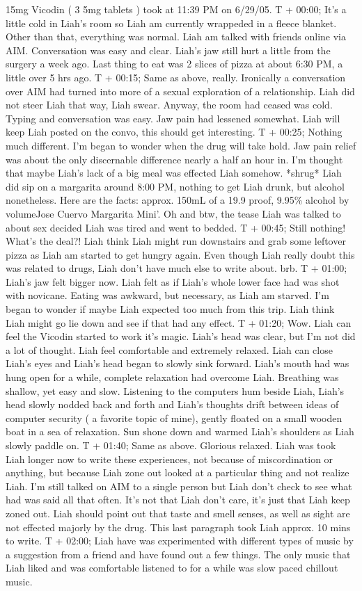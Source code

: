 \documentclass[12pt]{book}
\begin{document}
15mg Vicodin ( 3 5mg tablets ) took at 11:39 PM on 6/29/05. T + 00:00; It's a little cold in Liah's room so Liah am currently wrappeded in a fleece blanket. Other than that, everything was normal. Liah am talked with friends online via AIM. Conversation was easy and clear. Liah's jaw still hurt a little from the surgery a week ago. Last thing to eat was 2 slices of pizza at about 6:30 PM, a little over 5 hrs ago. T + 00:15; Same as above, really. Ironically a conversation over AIM had turned into more of a sexual exploration of a relationship. Liah did not steer Liah that way, Liah swear. Anyway, the room had ceased was cold. Typing and conversation was easy. Jaw pain had lessened somewhat. Liah will keep Liah posted on the convo, this should get interesting. T + 00:25; Nothing much different. I'm began to wonder when the drug will take hold. Jaw pain relief was about the only discernable difference nearly a half an hour in. I'm thought that maybe Liah's lack of a big meal was effected Liah somehow. *shrug* Liah did sip on a margarita around 8:00 PM, nothing to get Liah drunk, but alcohol nonetheless. Here are the facts: approx. 150mL of a 19.9 proof, 9.95\% alcohol by volumeJose Cuervo Margarita Mini'. Oh and btw, the tease Liah was talked to about sex decided Liah was tired and went to bedded. T + 00:45; Still nothing! What's the deal?! Liah think Liah might run downstairs and grab some leftover pizza as Liah am started to get hungry again. Even though Liah really doubt this was related to drugs, Liah don't have much else to write about. brb. T + 01:00; Liah's jaw felt bigger now. Liah felt as if Liah's whole lower face had was shot with novicane. Eating was awkward, but necessary, as Liah am starved. I'm began to wonder if maybe Liah expected too much from this trip. Liah think Liah might go lie down and see if that had any effect. T + 01:20; Wow. Liah can feel the Vicodin started to work it's magic. Liah's head was clear, but I'm not did a lot of thought. Liah feel comfortable and extremely relaxed. Liah can close Liah's eyes and Liah's head began to slowly sink forward. Liah's mouth had was hung open for a while, complete relaxation had overcome Liah. Breathing was shallow, yet easy and slow. Listening to the computers hum beside Liah, Liah's head slowly nodded back and forth and Liah's thoughts drift between ideas of computer security ( a favorite topic of mine), gently floated on a small wooden boat in a sea of relaxation. Sun shone down and warmed Liah's shoulders as Liah slowly paddle on. T + 01:40; Same as above. Glorious relaxed. Liah was took Liah longer now to write these experiences, not because of miscordination or anything, but because Liah zone out looked at a particular thing and not realize Liah. I'm still talked on AIM to a single person but Liah don't check to see what had was said all that often. It's not that Liah don't care, it's just that Liah keep zoned out. Liah should point out that taste and smell senses, as well as sight are not effected majorly by the drug. This last paragraph took Liah approx. 10 mins to write. T + 02:00; Liah have was experimented with different types of music by a suggestion from a friend and have found out a few things. The only music that Liah liked and was comfortable listened to for a while was slow paced chillout music. 
\end{document}
